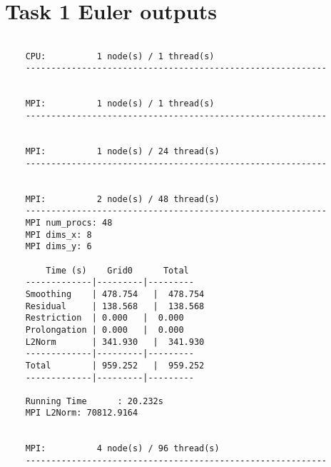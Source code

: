 \documentclass[11pt,a4paper]{article}
\begin{document}
\section{Task 1 Euler outputs}
\begin{lstlisting}[basicstyle=\tiny,
				   frame=single,
				   breaklines=true,
  	               postbreak=\mbox{\textcolor{red}{$\hookrightarrow$}\space},
				   caption={Task 2: Collected Euler outputs.}, label={lst:1}]
	
	CPU:          1 node(s) / 1 thread(s)
	-----------------------------------------------------------
	
	
	MPI:          1 node(s) / 1 thread(s)
	-----------------------------------------------------------
	
	
	MPI:          1 node(s) / 24 thread(s)
	-----------------------------------------------------------
	
	
	MPI:          2 node(s) / 48 thread(s)
	-----------------------------------------------------------
	MPI num_procs: 48
	MPI dims_x: 8
	MPI dims_y: 6
	
		Time (s)    Grid0      Total  
	-------------|---------|---------
	Smoothing    | 478.754   |  478.754  
	Residual     | 138.568   |  138.568  
	Restriction  | 0.000   |  0.000  
	Prolongation | 0.000   |  0.000  
	L2Norm       | 341.930   |  341.930  
	-------------|---------|---------
	Total        | 959.252   |  959.252  
	-------------|---------|---------
	
	Running Time      : 20.232s
	MPI L2Norm: 70812.9164
	
	
	MPI:          4 node(s) / 96 thread(s)
	-----------------------------------------------------------
	
	


	\end{lstlisting}
\end{document}
